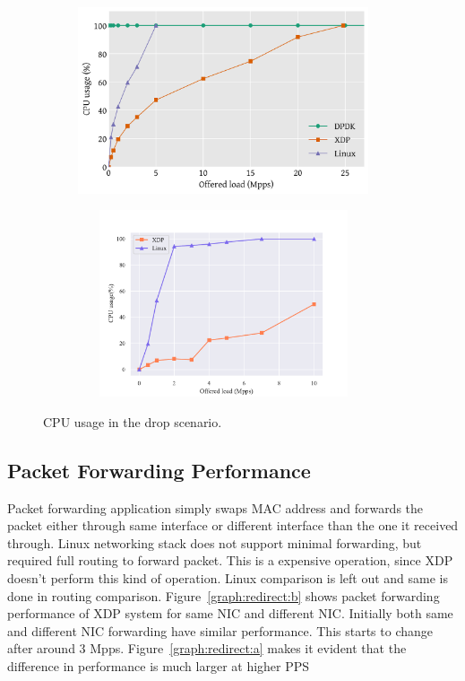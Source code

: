 \documentclass[12pt,titlepage]{article}
\begin{document}
\begin{figure}
    \centering
    \begin{minipage}{0.49\textwidth}
        \centering
        \includegraphics[width=0.95\textwidth,height=5.5cm]{original/drop-cpu.pdf} %
        \label{graph:drop-cpu:a}
    \end{minipage}\hfill
    \begin{minipage}{0.49\textwidth}
        \centering
        \includegraphics[width=0.95\textwidth,height=5.5cm]{img/drop-cpu.pdf} %
        \label{graph:drop-cpu:b}
    \end{minipage}
     \caption{CPU usage in the drop scenario.}
     \label{graph:drop-cpu}
\end{figure}



\subsection{Packet Forwarding Performance}

Packet forwarding application simply swaps MAC address and forwards the packet either through same interface or different interface than the one it received through. Linux networking stack does not support minimal forwarding, but required full routing to forward packet. This is a expensive operation, since XDP doesn't perform this kind of operation. Linux comparison is left out and same is done in routing comparison. Figure~\ref{graph:redirect:b} shows packet forwarding performance of XDP system for same NIC and different NIC. Initially both same and different NIC forwarding have similar performance. This starts to change after around 3 Mpps.  Figure~\ref{graph:redirect:a} makes it evident that the difference in performance is much larger at higher PPS
\end{document}
